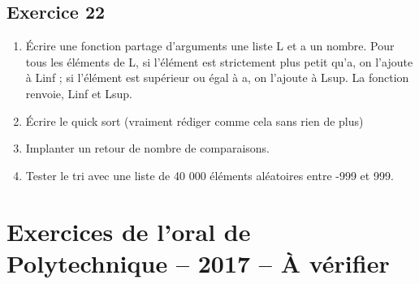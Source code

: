 \documentclass[10pt,fleqn]{article} %
\begin{document}
\begin{multicols}{2}
\subsection*{Exercice 22}

\begin{enumerate}
\item Écrire une fonction partage d’arguments une liste L et a un nombre. Pour tous les éléments de L, si l’élément est strictement plus petit qu’a, on l’ajoute à Linf ; si l’élément est supérieur ou égal à a, on l’ajoute à Lsup. La fonction renvoie, Linf et Lsup.
\item Écrire le quick sort (vraiment rédiger comme cela sans rien de plus)
\item Implanter un retour de nombre de comparaisons.
\item Tester le tri avec une liste de 40 000 éléments aléatoires entre -999 et 999.
\end{enumerate}
\end{multicols}

\newpage


\section{Exercices de l'oral de Polytechnique -- 2017 -- À vérifier}
\end{document}
